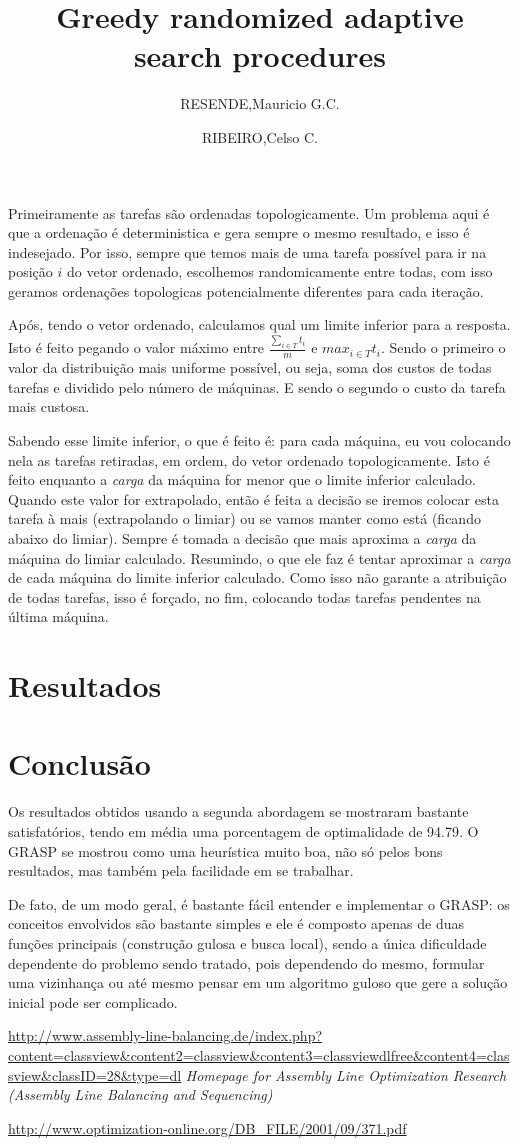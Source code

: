 \documentclass{report}
\begin{document}
Primeiramente as tarefas são ordenadas topologicamente.
Um problema aqui é que a ordenação é deterministica e gera
sempre o mesmo resultado, e isso é indesejado.
Por isso, sempre que temos mais de uma tarefa possível para ir na
posição $i$ do vetor ordenado, escolhemos randomicamente entre todas,
com isso geramos ordenações topologicas
potencialmente diferentes para cada iteração.

Após, tendo o vetor ordenado, calculamos qual um limite inferior para a
resposta. Isto é feito pegando o valor máximo entre $\frac{\sum_{i\in T}t_i}{m}$ e $max_{i\in T}t_i$. Sendo o primeiro
o valor da distribuição mais uniforme possível, ou seja, soma dos custos de todas tarefas e dividido pelo
número de máquinas. E sendo o segundo o custo da tarefa mais custosa.

Sabendo esse limite inferior, o que é feito é: para cada máquina, eu vou colocando nela as tarefas retiradas, em ordem,
do vetor ordenado topologicamente. Isto é feito enquanto a \emph{carga} da máquina for menor que o limite inferior
calculado. Quando este valor for extrapolado, então é feita a decisão se iremos colocar esta tarefa à mais
(extrapolando o limiar) ou se vamos manter como está (ficando abaixo do limiar). Sempre é tomada a decisão que mais
aproxima a \emph{carga} da máquina do limiar calculado. Resumindo, o que ele faz é tentar aproximar a \emph{carga} de
cada máquina do limite inferior calculado. Como isso não garante a atribuição de todas tarefas, isso é forçado, no fim,
colocando todas tarefas pendentes na última máquina.

\chapter{Resultados}


\chapter{Conclusão}

Os resultados obtidos usando a segunda abordagem se mostraram bastante
satisfatórios, tendo em média uma porcentagem de optimalidade de 94.79. O
GRASP se mostrou como uma heurística muito boa, não só pelos bons resultados,
mas também pela facilidade em se
trabalhar.

De fato, de um modo geral, é bastante fácil entender e implementar o GRASP:
os conceitos envolvidos são bastante simples e ele é composto apenas de duas
funções principais (construção gulosa e busca local), sendo a única
dificuldade dependente do problemo sendo tratado, pois dependendo do mesmo,
formular uma vizinhança ou até mesmo pensar
em um algoritmo guloso que gere a solução inicial pode ser complicado.



	\url{http://www.assembly-line-balancing.de/index.php?content=classview&content2=classview&content3=classviewdlfree&content4=classview&classID=28&type=dl}
	\emph{Homepage for Assembly Line Optimization Research (Assembly Line Balancing and Sequencing)}


	\url{http://www.optimization-online.org/DB_FILE/2001/09/371.pdf}
	\title{Greedy randomized adaptive search procedures}
	\author{RESENDE,Mauricio G.C. \and RIBEIRO,Celso C.}
\end{document}
